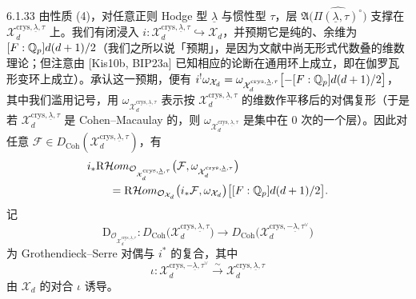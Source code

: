 \begin{rem}{6.1.33}
由性质 (4)，对任意正则 Hodge 型 $\underline\lambda$ 与惯性型 $\tau$，层 $\mathfrak A\bigl(\widehat{\Pi(\underline\lambda,\tau)^\circ}\bigr)$ 支撑在 $\mathcal X_d^{\mathrm{crys},\underline\lambda,\tau}$ 上。我们有闭浸入 $i:\mathcal X_d^{\mathrm{crys},\underline\lambda,\tau}\hookrightarrow\mathcal X_d$，并预期它是纯的、余维为 $[F:\mathbb{Q}_p]d(d+1)/2$（我们之所以说「预期」，是因为文献中尚无形式代数叠的维数理论；但注意由 [Kis10b, BIP23a] 已知相应的论断在通用环上成立，即在伽罗瓦形变环上成立）。承认这一预期，便有 $i^!\omega_{\mathcal X_d}=\omega_{\mathcal X_d^{\mathrm{crys},\underline\lambda,\tau}}\bigl[-[F:\mathbb{Q}_p]d(d+1)/2\bigr]$，其中我们滥用记号，用 $\omega_{\mathcal X_d^{\mathrm{crys},\underline\lambda,\tau}}$ 表示按 $\mathcal X_d^{\mathrm{crys},\underline\lambda,\tau}$ 的维数作平移后的对偶复形（于是若 $\mathcal X_d^{\mathrm{crys},\underline\lambda,\tau}$ 是 Cohen--Macaulay 的，则 $\omega_{\mathcal X_d^{\mathrm{crys},\underline\lambda,\tau}}$ 是集中在 0 次的一个层）。因此对任意 $\mathcal F\in D_{\mathrm{Coh}}(\mathcal X_d^{\mathrm{crys},\underline\lambda,\tau})$，有
\[
\begin{aligned}
&i_*\mathrm{R}\mathcal Hom_{\mathcal O_{\mathcal X_d^{\mathrm{crys},\underline\lambda,\tau}}}
\bigl(\mathcal F,\omega_{\mathcal X_d^{\mathrm{crys},\underline\lambda,\tau}}\bigr)\\
&\qquad=\mathrm{R}\mathcal Hom_{\mathcal O_{\mathcal X_d}}\bigl(i_*\mathcal F,\omega_{\mathcal X_d}\bigr)
\bigl[[F:\mathbb{Q}_p]d(d+1)/2\bigr].
\end{aligned}
\]
记
\[
\mathrm{D}_{\mathcal O_{\mathcal X_d^{\mathrm{crys},\underline\lambda,\tau}}}:
D_{\mathrm{Coh}}\bigl(\mathcal X_d^{\mathrm{crys},\underline\lambda,\tau}\bigr)
\to D_{\mathrm{Coh}}\bigl(\mathcal X_d^{\mathrm{crys},-\underline\lambda,\tau^\vee}\bigr)
\]
为 Grothendieck--Serre 对偶与 $i^*$ 的复合，其中
\[
\iota:\mathcal X_d^{\mathrm{crys},-\underline\lambda,\tau^\vee}
\xrightarrow{\ \sim\ }\mathcal X_d^{\mathrm{crys},\underline\lambda,\tau}
\]
由 $\mathcal X_d$ 的对合 $\iota$ 诱导。


\end{rem}
